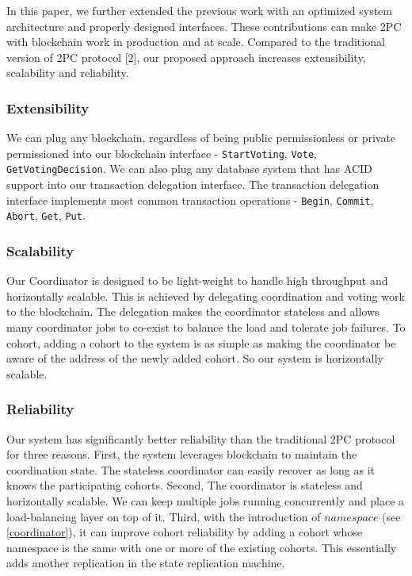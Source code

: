 \documentclass[11pt,conference]{IEEEtran}
\begin{document}
In this paper, we further extended the previous work with an optimized system architecture and properly designed interfaces. These contributions can make 2PC with blockchain work in production and at scale. Compared to the traditional version of 2PC protocol [2], our proposed approach increases extensibility, scalability and reliability.


\subsubsection{Extensibility}
We can plug any blockchain, regardless of being public permissionless or private permissioned into our blockchain interface - \texttt{StartVoting}, \texttt{Vote}, \texttt{GetVotingDecision}. We can also plug any database system that has ACID support into our transaction delegation interface. The transaction delegation interface implements most common transaction operations - \texttt{Begin}, \texttt{Commit}, \texttt{Abort}, \texttt{Get}, \texttt{Put}.

\subsubsection{Scalability}
Our Coordinator is designed to be light-weight to handle high throughput and horizontally scalable. This is achieved by delegating coordination and voting work to the blockchain. The delegation makes the coordinator stateless and allows many coordinator jobs to co-exist to balance the load and tolerate job failures. To cohort, adding a cohort to the system is as simple as making the coordinator be aware of the address of the newly added cohort. So our system is horizontally scalable.

\subsubsection{Reliability}
Our system has significantly better reliability than the traditional 2PC protocol for three reasons. First, the system leverages blockchain to maintain the coordination state. The stateless coordinator can easily recover as long as it knows the participating cohorts. Second, The coordinator is stateless and horizontally scalable. We can keep multiple jobs running concurrently and place a load-balancing layer on top of it. Third, with the introduction of $namespace$ (see \ref{coordinator}), it can improve cohort reliability by adding a cohort whose namespace is the same with one or more of the existing cohorts. This essentially adds another replication in the state replication machine.
\end{document}

